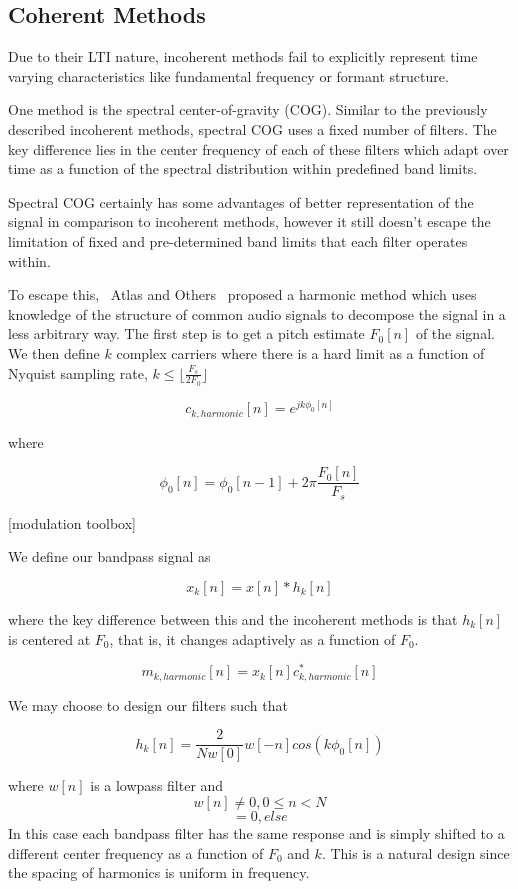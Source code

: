 \documentclass [11pt, proquest] {uwthesis}[2015/03/03]
\begin{document}
\subsection{Coherent Methods}

Due to their LTI nature, incoherent methods fail to explicitly represent time varying characteristics like fundamental frequency or formant structure. \cite{wilson1993design}

One method is the spectral center-of-gravity (COG).  Similar to the previously described incoherent methods, spectral COG uses a fixed number of filters.  The key difference lies in the center frequency of each of these filters which adapt over time as a function of the spectral distribution within predefined band limits.

Spectral COG certainly has some advantages of better representation of the signal in comparison to incoherent methods, however it still doesn't escape the limitation of fixed and pre-determined band limits that each filter operates within.

To escape this, ~Atlas and Others~ proposed a harmonic method which uses knowledge of the structure of common audio signals to decompose the signal in a less arbitrary way.  The first step is to get a pitch estimate $F_0[n]$ of the signal.  We then define $k$ complex carriers where there is a hard limit as a function of Nyquist sampling rate, $k \leq  \lfloor \frac{F_s}{2F_0} \rfloor$

$$c_{k,harmonic}[n] = e^{jk\phi_0 [n]}$$

where 

$$\phi_0[n] = \phi_0[n - 1] + 2\pi \frac{F_0[n]}{F_s}$$

[modulation toolbox]

We define our bandpass signal as 

$$x_k[n] = x[n] * h_k[n]$$

where the key difference between this and the incoherent methods is that $h_k[n]$ is centered at $F_0$, that is, it changes adaptively as a function of $F_0$.

$$m_{k,harmonic}[n] = x_k[n] c_{k,harmonic}^*[n] $$

We may choose to design our filters such that

$$h_k[n] = \frac{2}{Nw[0]} w[-n] cos( k \phi_0[n])$$

where $w[n]$ is a lowpass filter and 
$$w[n] \neq 0, 0 \leq n < N$$
$$ = 0, else$$
In this case each bandpass filter has the same response and is simply shifted to a different center frequency as a function of $F_0$ and $k$.  This is a natural design since the spacing of harmonics is uniform in frequency.
\end{document}
